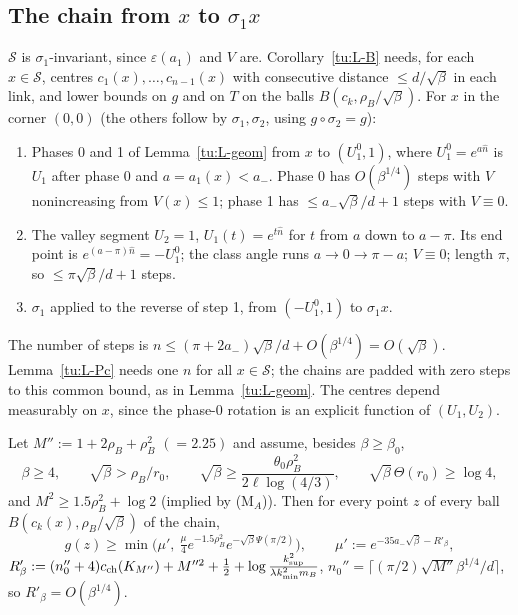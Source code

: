 \subsection{The chain from $x$ to $\sigma_1x$}\label{tu:L-chainsec}
$\mathcal S$ is $\sigma_1$-invariant, since $\varepsilon(a_1)$ and $V$ are. Corollary~\ref{tu:L-B} needs, for each $x\in\mathcal S$, centres
$c_1(x),\dots,c_{n-1}(x)$ with consecutive distance $\le d/\sqrt\beta$ in each link, and lower bounds on $g$ and on $T$ on the
balls $B(c_k,\rho_B/\sqrt\beta)$. For $x$ in the corner $(0,0)$ (the others follow by $\sigma_1,\sigma_2$, using $g\circ\sigma_2=g$):
\begin{enumerate}
\item Phases 0 and 1 of Lemma~\ref{tu:L-geom} from $x$ to $(U_1^0,1)$, where $U_1^0=e^{a\hat n}$ is $U_1$ after phase 0 and
$a=a_1(x)<a_-$. Phase 0 has $O(\beta^{1/4})$ steps with $V$ nonincreasing from $V(x)\le1$; phase 1 has $\le a_-\sqrt\beta/d+1$ steps with $V\equiv0$.
\item The valley segment $U_2=1$, $U_1(t)=e^{t\hat n}$ for $t$ from $a$ down to $a-\pi$. Its end point is $e^{(a-\pi)\hat n}=-U_1^0$; the
class angle runs $a\to0\to\pi-a$; $V\equiv0$; length $\pi$, so $\le\pi\sqrt\beta/d+1$ steps.
\item $\sigma_1$ applied to the reverse of step 1, from $(-U_1^0,1)$ to $\sigma_1x$.
\end{enumerate}
The number of steps is $n\le(\pi+2a_-)\sqrt\beta/d+O(\beta^{1/4})=O(\sqrt\beta)$. Lemma~\ref{tu:L-Pc} needs one $n$ for all
$x\in\mathcal S$; the chains are padded with zero steps to this common bound, as in Lemma~\ref{tu:L-geom}. The centres depend measurably on $x$, since the
phase-0 rotation is an explicit function of $(U_1,U_2)$.

\begin{lemma}\label{tu:L-balls}
Let $M'':=1+2\rho_B+\rho_B^2$ $(=2.25)$ and assume, besides $\beta\ge\beta_0$,
\[
\beta\ge4,\qquad \sqrt\beta>\rho_B/r_0,\qquad \sqrt\beta\ge\frac{\theta_0\rho_B^2}{2\ell\log(4/3)},\qquad\sqrt\beta\,\Theta(r_0)\ge\log4 ,
\]
and $M^2\ge1.5\rho_B^2+\log2$ (implied by (M$_A$)). Then for every point $z$ of every ball $B(c_k(x),\rho_B/\sqrt\beta)$ of the chain,
\[
g(z)\ge\min\big(\mu',\ \tfrac\mu4e^{-1.5\rho_B^2}e^{-\sqrt\beta\Psi(\pi/2)}\big),\qquad
\mu':=e^{-35a_-\sqrt\beta-R'_\beta},
\]
$R'_\beta:=(n_0''+4)c_{\rm ch}(K_{M''})+M''^2+\tfrac12+\log\frac{k_{\sup}^2}{\lambda k_{\min}^2m_B}$, $n_0''=\lceil(\pi/2)\sqrt{M''}\beta^{1/4}/d\rceil$,
so $R'_\beta=O(\beta^{1/4})$.
\end{lemma}

